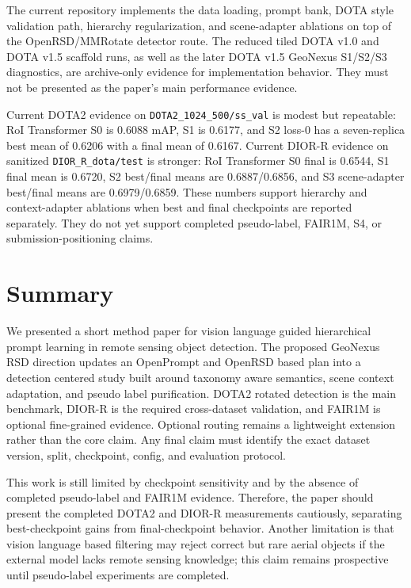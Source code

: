\documentclass[10pt]{article}
\begin{document}
The current repository implements the data loading, prompt bank, DOTA style validation path, hierarchy regularization, and scene-adapter ablations on top of the OpenRSD/MMRotate detector route. The reduced tiled DOTA v1.0 and DOTA v1.5 scaffold runs, as well as the later DOTA v1.5 GeoNexus S1/S2/S3 diagnostics, are archive-only evidence for implementation behavior. They must not be presented as the paper's main performance evidence.

Current DOTA2 evidence on \texttt{DOTA2\_1024\_500/ss\_val} is modest but repeatable: RoI Transformer S0 is 0.6088 mAP, S1 is 0.6177, and S2 loss-0 has a seven-replica best mean of 0.6206 with a final mean of 0.6167. Current DIOR-R evidence on sanitized \texttt{DIOR\_R\_dota/test} is stronger: RoI Transformer S0 final is 0.6544, S1 final mean is 0.6720, S2 best/final means are 0.6887/0.6856, and S3 scene-adapter best/final means are 0.6979/0.6859. These numbers support hierarchy and context-adapter ablations when best and final checkpoints are reported separately. They do not yet support completed pseudo-label, FAIR1M, S4, or submission-positioning claims.

\section{Summary}

We presented a short method paper for vision language guided hierarchical prompt learning in remote sensing object detection. The proposed GeoNexus RSD direction updates an OpenPrompt and OpenRSD based plan into a detection centered study built around taxonomy aware semantics, scene context adaptation, and pseudo label purification. DOTA2 rotated detection is the main benchmark, DIOR-R is the required cross-dataset validation, and FAIR1M is optional fine-grained evidence. Optional routing remains a lightweight extension rather than the core claim. Any final claim must identify the exact dataset version, split, checkpoint, config, and evaluation protocol.

This work is still limited by checkpoint sensitivity and by the absence of completed pseudo-label and FAIR1M evidence. Therefore, the paper should present the completed DOTA2 and DIOR-R measurements cautiously, separating best-checkpoint gains from final-checkpoint behavior. Another limitation is that vision language based filtering may reject correct but rare aerial objects if the external model lacks remote sensing knowledge; this claim remains prospective until pseudo-label experiments are completed.
\end{document}
